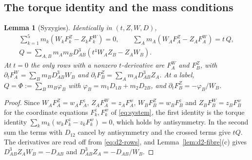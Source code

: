 \documentclass[11pt]{amsart}
\newtheorem{lemma}[theorem]{Lemma}
\theoremstyle{definition}
\theoremstyle{remark}
\begin{document}
\subsection{\texorpdfstring{The torque identity and the mass conditions}{The torque identity and the mass conditions}}\label{sec:d2-first}

\begin{lemma}[Syzygies]\label{lem:d2-syzygy}
Identically in $(t,Z,W,D)$,
\begin{gather*}
  \textstyle\sum_{k=1}^5m_k(W_kF^Z_k-Z_kF^W_k)=0,\qquad
  \sum_Am_A(W_AF^Z_A-Z_AF^W_A)=t\,Q,\\
  Q=\textstyle\sum_{A,B}m_Am_BD_{AB}^3(t^4W_AZ_B-Z_AW_B).
\end{gather*}
At $t=0$ the only rows with a nonzero $t$-derivative are $F^W_A$ and $F^Z_B$, with
$\partial_tF^W_A=\sum_Bm_BD_{AB}^3W_B$ and $\partial_tF^Z_B=\sum_Am_AD_{AB}^3Z_A$.  At a label,
$Q=\Phi:=\sum_Bm_B\varphi_B$ with $\varphi_B=m_1D_{1B}+m_2D_{2B}$, and
$\partial_tF^Z_B=-\varphi_B/W_B$.
\end{lemma}

\begin{proof}
Since $W_AF^Z_A=w_AF^z_A$, $Z_AF^W_A=z_AF^w_A$, $W_BF^Z_B=w_BF^z_B$ and $Z_BF^W_B=z_BF^w_B$ for
the coordinate equations $F^z_k,F^w_k$ of \eqref{eq:system}, the first identity is the torque
identity $\sum_km_k(w_kF^z_k-z_kF^w_k)=0$, which holds by antisymmetry.  In the second sum the
terms with $D_{12}$ cancel by antisymmetry and the crossed terms give $tQ$.  The derivatives are
read off from \eqref{eq:d2-rows}, and Lemma~\ref{lem:d2-fibre}(c) gives
$D_{AB}^3Z_AW_B=-D_{AB}$ and $D_{AB}^3Z_A=-D_{AB}/W_B$.
\end{proof}
\end{document}
